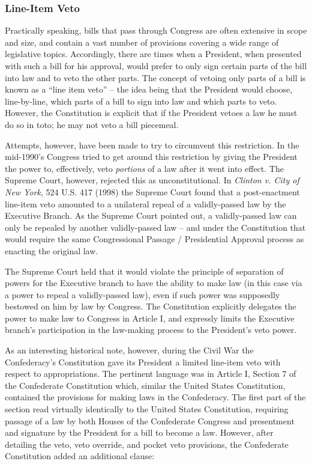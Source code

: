 \subsubsection{Line-Item Veto}
Practically speaking, bills that pass through Congress are often extensive in scope and size, and contain a vast number of provisions covering a wide range of legislative topics.  Accordingly, there are times when a President, when presented with such a bill for his approval, would prefer to only sign certain parts of the bill into law and to veto the other parts.  The concept of vetoing only parts of a bill is known as a ``line item veto'' -- the idea being that the President would choose, line-by-line, which parts of a bill to sign into law and which parts to veto.
However, the Constitution is explicit that if the President vetoes a law he must do so in toto; he may not veto a bill piecemeal.

Attempts, however, have been made to try to circumvent this restriction.
In the mid-1990's Congress tried to get around this restriction by giving the President the power to, effectively, veto \textit{portions} of a law after it went into effect.
The Supreme Court, however, rejected this as unconstitutional.  In \textit{Clinton v. City of New York}, 524 U.S. 417 (1998) the Supreme Court found that a post-enactment line-item veto amounted to a unilateral repeal of a validly-passed law by the Executive Branch.  As the Supreme Court pointed out, a validly-passed law can only be repealed by another validly-passed law -- and under the Constitution that would require the same Congressional Passage / Presidential Approval process as enacting the original law.

The Supreme Court held that it would violate the principle of separation of powers for the Executive branch to have the ability to make law (in this case via a power to repeal a validly-passed law), even if such power was supposedly bestowed on him by law by Congress.  The Constitution explicitly delegates the power to make law to Congress in Article I, and expressly limits the Executive branch's participation in the law-making process to the President's veto power.

As an interesting historical note, however, during the Civil War the Confederacy's Constitution gave its President a limited line-item veto with respect to appropriations.
The pertinent language was in Article I, Section 7 of the Confederate Constitution which, similar the United States Constitution, contained the provisions for making laws in the Confederacy.
The first part of the section read virtually identically to the United States Constitution, requiring passage of a law by both Houses of the Confederate Congress and presentment and signature by the President for a bill to become a law.
However, after detailing the veto, veto override, and pocket veto provisions, the Confederate Constitution added an additional clause:

